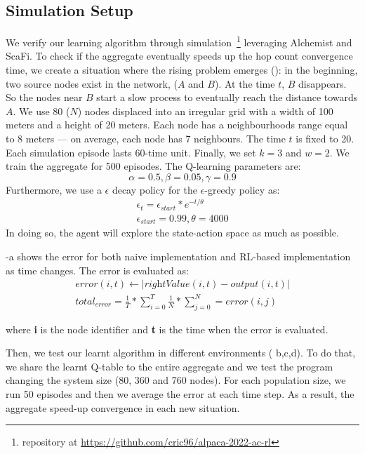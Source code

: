 \documentclass[conference]{IEEEtran}
\begin{document}
\subsection{Simulation Setup}
We verify our learning algorithm through simulation~\footnote{repository at \url{https://github.com/cric96/alpaca-2022-ac-rl}} leveraging Alchemist and ScaFi.
 To check if the aggregate eventually speeds up the hop count convergence time, we create a situation where the rising problem emerges ():
 in the beginning, two source nodes exist in the network, ($A$ and $B$).
 At the time $t$, $B$ disappears. So the nodes near $B$ start a slow process
 to eventually reach the distance towards $A$.
We use 80 ($N$) nodes displaced into an irregular grid with a width of 100 meters and a height of 20 meters. 
 Each node has a neighbourhoods range equal to 8 meters --- on average, each node has 7 neighbours. 
 The time $t$ is fixed to 20.
 Each simulation episode lasts 60-time unit. Finally, we set $k = 3$ and $w = 2$.
% 
We train the aggregate for 500 episodes.
 The Q-learning parameters are:
$$ 
\alpha = 0.5,
\beta = 0.05,
\gamma = 0.9
$$
Furthermore, we use a $\epsilon$ decay policy for the $\epsilon$-greedy policy as:
\begin{equation*}
  \begin{array}{l}
    \epsilon_t = \epsilon_{start} * e^{-t/\theta}\\ 
    \epsilon_{start }= 0.99, \theta=4000
  \end{array}
\end{equation*}
In doing so, the agent will explore the state-action space as much as possible.

-a shows the error for both naive implementation and RL-based implementation as time changes.
The error is evaluated as:
\begin{equation*}
  \begin{array}{l}
    error(i, t) \leftarrow  | \textit{rightValue}(i,t) - \textit{output}(i,t) | \\
    total_{error} = \frac{1}{T} * \sum_{i = 0}^T \frac{1}{N} * \sum_{j = 0}^N = error(i, j)
  \end{array}
\end{equation*}

where \textbf{i} is the node identifier and \textbf{t} is the time when the error is evaluated.
%

Then, we test our learnt algorithm in different environments ( b,c,d). To do that, we share the learnt Q-table to the 
entire aggregate and we test the program changing the system size (80, 360 and 760 nodes).
For each population size, we run 50 episodes and then we average the error at each time step. 
As a result, the aggregate speed-up convergence in each new situation.
\end{document}
